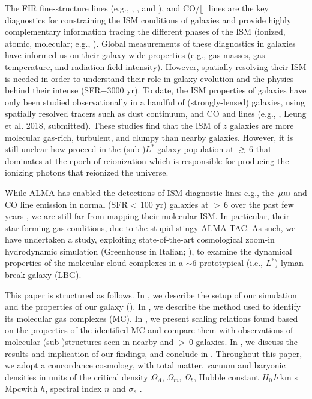 \documentclass[apj]{emulateapj} %
\begin{document}
The FIR fine-structure lines (e.g., \cii, \nii, and \oiii), and CO/[\ci]~lines are the key diagnostics for 
constraining the ISM conditions of galaxies and
provide highly complementary information tracing the different phases of the ISM (ionized, 
atomic, molecular; e.g., \citealt{Scoville74a, Rubin85a, Malhotra01a}).
Global measurements of these diagnostics in \highz galaxies 
have informed us on their galaxy-wide properties (e.g., 
gas masses, gas temperature, and radiation field intensity).
However, spatially resolving their ISM is needed in order to understand their role in galaxy evolution and 
the physics behind their intense \SF (SFR$-$3000\,\Msun\,yr\pmOne).
To date, the ISM properties of \highz galaxies 
have only been studied observationally in a handful of (strongly-lensed) 
galaxies, using spatially resolved tracers such as 
dust continuum, and CO and \cii lines (e.g., \citealt{Swinbank11a, Hodge15a, Ferkinhoff15a, Hodge16a},
Leung et al. 2018, submitted).
These studies find that the ISM of $z$ galaxies are more 
molecular gas-rich, turbulent, and clumpy than nearby galaxies.
However, it is still unclear how \SF proceed in the (sub-)$L^*$ galaxy population at \z$\gtrsim$\,6 
that dominates  \SF at the epoch of reionization which is responsible for producing the 
ionizing photons that reionized the universe.

While ALMA has enabled the detections of 
ISM diagnostic lines e.g., the \,$\mbox{$\mu$m}$ and CO line emission in 
normal (SFR$<$\,100\,\Msun\,yr\pmOne) galaxies at \z$>$\,6 over the past few years \citep[e.g.,][]{Smit18a},
we are still far from mapping their molecular ISM.
In particular, their star-forming gas conditions, due to the stupid stingy ALMA TAC.
As such, we have undertaken a study, exploiting 
state-of-the-art cosmological zoom-in hydrodynamic simulation 
 (Greenhouse in Italian; \citealt{Pallottini17a, Pallottini17b}), to examine 
the dynamical properties of the molecular cloud complexes in a \z$\sim$6 prototypical (i.e., $L^*$) lyman-break
galaxy (LBG).

This paper is structured as follows.
In , we describe the setup of our simulation and the properties of our galaxy (\flower).
In , we describe the method used to identify its molecular gas complexes (MC). 
In , we present scaling relations found based on the properties of 
the identified MC and compare them with observations of molecular 
(sub-)structures seen in nearby and \z$>$\,0 galaxies.
In , we discuss the results and implication of our findings,
and conclude in .
Throughout this paper, we adopt a concordance cosmology, with total matter, vacuum and baryonic densities 
in units of the critical density $\Omega_{\Lambda}$, $\Omega_m$, $\Omega_b$, 
Hubble constant $H_0$\,$h$\,km s\pmOne\,Mpc\pmOne with $h$, 
spectral index $n$ and $\sigma_8$ \citep{Planck14a}.
\end{document}
